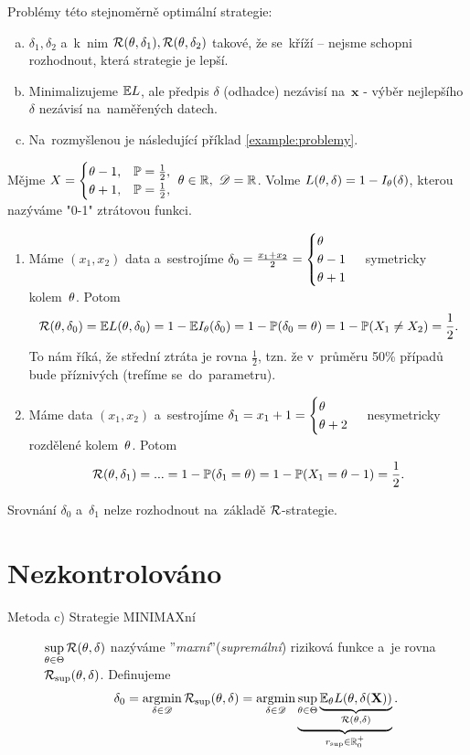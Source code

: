 \begin{description}
	Problémy této stejnoměrně optimální strategie: \begin{enumerate}[a)]
		\item $\delta_1,\delta_2$ a~k~nim $\mathcal{R}(\theta,\delta_1),\mathcal{R}(\theta,\delta_2)$ takové, že se~kříží -- nejsme schopni rozhodnout, která strategie je lepší.
		\item Minimalizujeme $\mathbb{E} L$, ale předpis $\delta$ (odhadce) nezávisí na~$\textbf{x}$ - výběr nejlepšího $\delta$ nezávisí na~naměřených datech.
		\item Na~rozmyšlenou je následující příklad \ref{example:problemy}.
	\end{enumerate}
\end{description}

\begin{example} \label{example:problemy}
	Mějme $X=\begin{cases}
	\theta-1,& \mathbb{P}=\frac{1}{2}, \\ \theta+1,& \mathbb{P}=\frac{1}{2},
	\end{cases}~\theta\in\mathbb{R},~\mathscr{D}=\mathbb{R}$. Volme
	$ L(\theta,\delta)=1-I_\theta(\delta)$, kterou nazýváme "0-1" ztrátovou funkci.
	
	\begin{enumerate}[1)]
		\item Máme $(x_1,x_2)$ data a~sestrojíme $\delta_0=\frac{x_1+x_2}{2}=\begin{cases}
		\theta\\\theta-1\\\theta+1
		\end{cases}$ symetricky kolem~$\theta$. Potom
		$$ \mathcal{R}(\theta,\delta_0)=\mathbb{E} L(\theta,\delta_0)=1-\mathbb{E} I_\theta(\delta_0)=1-\mathbb{P}(\delta_0=\theta)=1-\mathbb{P}(X_1\neq X_2)=\frac{1}{2}.$$ To nám říká, že střední ztráta je rovna $\frac{1}{2}$, tzn. že v~průměru 50\% případů bude příznivých (trefíme se~do~parametru).
		\item Máme data $(x_1,x_2)$ a~sestrojíme $\delta_1=x_1+1=\begin{cases}
		\theta\\\theta+2
		\end{cases}$ nesymetricky rozdělené kolem~$\theta$. Potom
		$$\mathcal{R}(\theta,\delta_1)=...=1-\mathbb{P}(\delta_1=\theta)=1-\mathbb{P}(X_1=\theta-1)=\frac{1}{2}.$$
	\end{enumerate}
	Srovnání $\delta_0$ a~$\delta_1$ nelze rozhodnout na~základě $\mathcal{R}$-strategie. 
\end{example}

\chapter{Nezkontrolováno}
\begin{description}
	\item[Metoda c) Strategie MINIMAXní] $\sup\limits_{\theta\in\Theta} \mathcal{R}(\theta,\delta)$ nazýváme ''\textit{maxní}''(\textit{supremální}) riziková funkce a~je rovna $\mathcal{R}_{\sup}(\theta,\delta)$. Definujeme 
	$$ \delta_0=\mathop{\mathrm{argmin}}\limits_{\delta\in\mathscr{D}}\mathcal{R}_{\sup}(\theta,\delta)=\mathop{\mathrm{argmin}}\limits_{\delta\in\mathscr{D}}\underbrace{\sup\limits_{\theta\in\Theta}\underbrace{\mathbb{E}_\theta L(\theta,\delta(\textbf{X}))}_{\mathcal{R}(\theta,\delta)}}_{r_{\sup}\in\mathbb{R}_0^+}.$$
\end{description}

